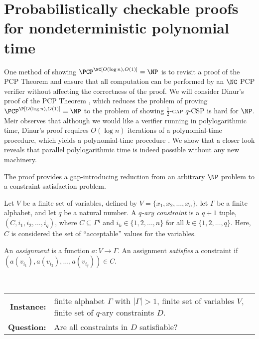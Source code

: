 \section{Probabilistically checkable proofs for nondeterministic polynomial time}
\label{sec:dinur}

One method of showing $\PCP^\NC[O(\log n), O(1)] = \NP$ is to revisit a proof of the PCP Theorem and ensure that all computation can be performed by an $\NC$ PCP verifier without affecting the correctness of the proof.
We will consider Dinur's proof of the PCP Theorem \autocite{dinur07}, which reduces the problem of proving $\PCP^\P[O(\log n), O(1)] = \NP$ to the problem of showing \textsc{$\frac{1}{2}$-gap $q$-CSP} is hard for $\NP$.
Meir observes that although we would like a verifier running in polylogarithmic time, Dinur's proof requires $O(\log n)$ iterations of a polynomial-time procedure, which yields a polynomial-time procedure \autocite[Section~1.2.1]{meir09}.
We show that a closer look reveals that parallel polylogarithmic time is indeed possible without any new machinery.

The proof provides a gap-introducing reduction from an arbitrary $\NP$ problem to a constraint satisfaction problem.

\begin{definition}
  Let $V$ be a finite set of variables, defined by $V = \{x_1, x_2, \dotsc, x_n\}$, let $\Gamma$ be a finite alphabet, and let $q$ be a natural number.
  A \emph{$q$-ary constraint} is a $q + 1$ tuple, $(C, i_1, i_2, \dotsc, i_q)$, where $C \subseteq \Gamma^q$ and $i_k \in \{1, 2, \dotsc, n\}$ for all $k \in \{1, 2, \ldots, q\}$.
  Here, $C$ is considered the set of ``acceptable'' values for the variables.

  An \emph{assignment} is a function $a \colon V \to \Gamma$.
  An assignment \emph{satisfies} a constraint if $(a(v_{i_1}), a(v_{i_2}), \dotsc, a(v_{i_q})) \in C$.
\end{definition}

\begin{definition}
  \mbox{} \\
  \begin{tabular}{r p{9.5cm}}
    \textbf{Instance:} & finite alphabet $\Gamma$ with $|\Gamma| > 1$, finite set of variables $V$, finite set of $q$-ary constraints $D$. \\
    \textbf{Question:} & Are all constraints in $D$ satisfiable?
  \end{tabular}
\end{definition}

